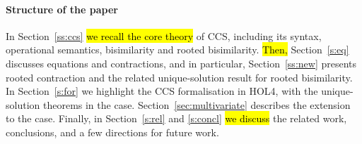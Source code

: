 \paragraph{Structure of the paper}

In Section~\ref{ss:ccs} \hl{we recall the core theory} of CCS,
including its syntax, operational semantics, bisimilarity and rooted
bisimilarity.
\hl{Then,} Section~\ref{s:eq} discusses equations and contractions, and in particular,
Section~\ref{ss:new} presents rooted contraction and the related
unique-solution result for rooted bisimilarity.
In Section~\ref{s:for} we highlight the CCS formalisation in HOL4, with
the unique-solution theorems in the \univariate case.
Section~\ref{sec:multivariate} describes the extension to the \multivariate case.
Finally, in Section~\ref{s:rel} and \ref{s:concl} \hl{we discuss} the related work,
conclusions, and a few directions for future work.

